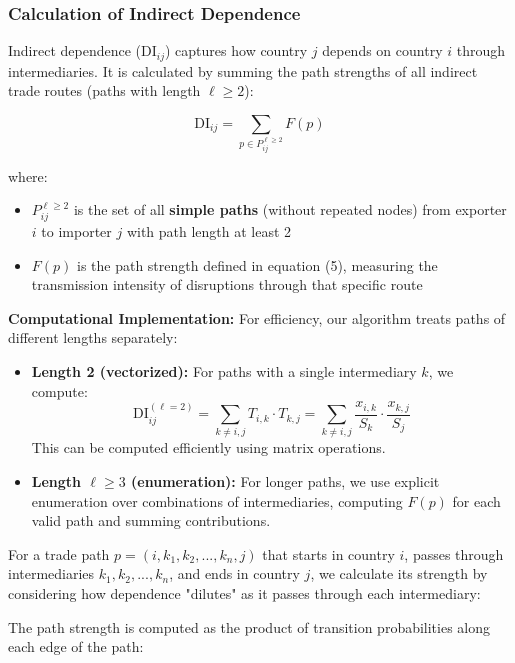 \documentclass[final,1p,times,authoryear]{elsarticle}
\begin{document}
\subsubsection{Calculation of Indirect Dependence}

Indirect dependence ($\text{DI}_{ij}$) captures how country $j$ depends on country $i$ through intermediaries. It is calculated by summing the path strengths of all indirect trade routes (paths with length $\ell \geq 2$):

\begin{equation}
\text{DI}_{ij} = \sum_{p \in P_{ij}^{\ell \geq 2}} F(p)
\end{equation}

\noindent where:
\begin{itemize}
    \item $P_{ij}^{\ell \geq 2}$ is the set of all \textbf{simple paths} (without repeated nodes) from exporter $i$ to importer $j$ with path length at least 2
    \item $F(p)$ is the path strength defined in equation (5), measuring the transmission intensity of disruptions through that specific route
\end{itemize}

\textbf{Computational Implementation:} For efficiency, our algorithm treats paths of different lengths separately:
\begin{itemize}
    \item \textbf{Length 2 (vectorized):} For paths with a single intermediary $k$, we compute:
    \begin{equation}
    \text{DI}_{ij}^{(\ell=2)} = \sum_{k \neq i,j} T_{i,k} \cdot T_{k,j} = \sum_{k \neq i,j} \frac{x_{i,k}}{S_k} \cdot \frac{x_{k,j}}{S_j}
    \end{equation}
    This can be computed efficiently using matrix operations.

    \item \textbf{Length $\ell \geq 3$ (enumeration):} For longer paths, we use explicit enumeration over combinations of intermediaries, computing $F(p)$ for each valid path and summing contributions.
\end{itemize}

For a trade path $p = (i, k_1, k_2, ..., k_n, j)$ that starts in country $i$, passes through intermediaries $k_1, k_2, ..., k_n$, and ends in country $j$, we calculate its strength by considering how dependence "dilutes" as it passes through each intermediary:

The path strength is computed as the product of transition probabilities along each edge of the path:
\end{document}
